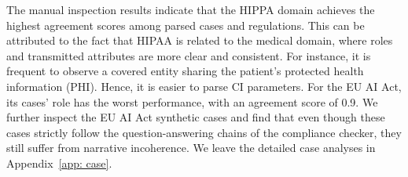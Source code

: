 The manual inspection results indicate that the HIPPA domain achieves the highest agreement scores among parsed cases and regulations.
This can be attributed to the fact that HIPAA is related to the medical domain, where roles and transmitted attributes are more clear and consistent.
For instance, it is frequent to observe a covered entity sharing the patient's protected health information (PHI).
Hence, it is easier to parse CI parameters.
For the EU AI Act, its cases' role has the worst performance, with an agreement score of 0.9.
We further inspect the EU AI Act synthetic cases and find that even though these cases strictly follow the question-answering chains of the compliance checker, they still suffer from narrative incoherence.
We leave the detailed case analyses in Appendix~\ref{app: case}.